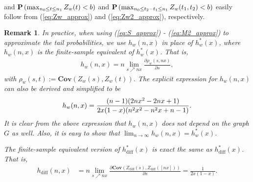 \documentclass[arxiv, preprint]{imsart}
\numberwithin{equation}{section}
\theoremstyle{plain}
\newtheorem{remark}[thm]{Remark}
\begin{document}
and $\mathbf{P} \left(\max_{n_0 \le t \le n_1} Z_w(t) < b \right)$ and  $\mathbf{P} \left(\max_{n_0 \le t_2 - t_1 \le n_1} Z_w(t_1, t_2) < b \right)$ easily follow from (\ref{eq:Zw_approx}) and (\ref{eq:Zw2_approx}), respectively. 

\begin{remark}
In practice, when using (\ref{eq:S_approx}) - (\ref{eq:M2_approx}) to approximate the tail probabilities,
we use $h_w(n, x)$ in place of $h^*_w(x)$, where $h_w(n, x)$ is the finite-sample equivalent of $h^*_w(x)$. That is, 
\begin{align*}
h_w(n,x) = n\lim_{s\nearrow nx} \frac{\partial \rho_w(s,nx)}{\partial s},
\end{align*}
with $\rho_w(s,t):= \textbf{Cov} (Z_w(s),Z_w(t))$.
The explicit expression for $h_w(n,x)$ can also be derived and simplified to be
\begin{equation}
\label{eq:hwn}
h_w(n,x)= \frac{(n - 1)(2n x^2 - 2nx + 1)}{2x (1-x)(n^2x^2 - n^2x + n - 1)}.\\
\end{equation}
It is clear from the above expression that $h_w(n,x)$ does not depend on the graph $G$ as well.  Also, it is easy to show that $\lim_{n \rightarrow \infty} h_w(n,x) = h^*_w(x)$.

The finite-sample equivalent version of $h^*_\text{diff}(x)$ is exact the same as $h^*_\text{diff}(x)$.  That is,
\begin{align*}
h_\text{diff}(n,x) & = n \lim_{s\nearrow nx} \frac{\partial \textbf{Cov} (Z_\text{diff}(s),Z_\text{diff}([nx]))}{\partial s} = \frac{1}{2x(1-x)}.
\end{align*}   


\end{remark}
\end{document}
